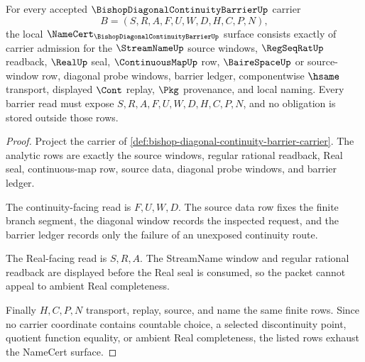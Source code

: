 \begin{theorem}
\label{thm:bishop-diagonal-continuity-barrier-namecert-obligations}
For every accepted $\BishopDiagonalContinuityBarrierUp$ carrier
$$
B=(S,R,A,F,U,W,D,H,C,P,N),
$$
the local $\NameCert_{\BishopDiagonalContinuityBarrierUp}$ surface consists exactly of carrier admission for the $\StreamNameUp$ source windows, $\RegSeqRatUp$ readback, $\RealUp$ seal, $\ContinuousMapUp$ row, $\BaireSpaceUp$ or source-window row, diagonal probe windows, barrier ledger, componentwise $\hsame$ transport, displayed $\Cont$ replay, $\Pkg$ provenance, and local naming. Every barrier read must expose $S,R,A,F,U,W,D,H,C,P,N$, and no obligation is stored outside those rows.
\end{theorem}
\begin{proof}
Project the carrier of \autoref{def:bishop-diagonal-continuity-barrier-carrier}. The analytic rows are exactly the source windows, regular rational readback, Real seal, continuous-map row, source data, diagonal probe windows, and barrier ledger.

The continuity-facing read is $F,U,W,D$. The source data row fixes the finite branch segment, the diagonal window records the inspected request, and the barrier ledger records only the failure of an unexposed continuity route.

The Real-facing read is $S,R,A$. The StreamName window and regular rational readback are displayed before the Real seal is consumed, so the packet cannot appeal to ambient Real completeness.

Finally $H,C,P,N$ transport, replay, source, and name the same finite rows. Since no carrier coordinate contains countable choice, a selected discontinuity point, quotient function equality, or ambient Real completeness, the listed rows exhaust the NameCert surface.
\end{proof}

